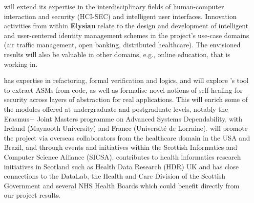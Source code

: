 \documentclass[a4paper,11pt]{article}
\newcommand{\project}[1]{\textbf{#1}\xspace}
\newcommand{\SECURITY}{\project{Elysian}}
\newcommand{\TheProject}{\SECURITY}
\begin{document}
\begin{mdframed}[backgroundcolor=blue!5]
\COGNIshort{} will extend its expertise in the interdisciplinary fields of human-computer interaction and security (HCI-SEC) and intelligent user interfaces. Innovation activities from \COGNIshort{} within \TheProject{} relate to the design and development of intelligent and user-centered identity management schemes in the project's use-case domains (air traffic management, open banking, distributed healthcare). The envisioned results will also be valuable in other domains, e.g., online education, that \COGNIshort{} is working in.
\end{mdframed}

\begin{mdframed}[backgroundcolor=blue!5]
\USTANshort{} has expertise in refactoring, formal verification and logics, and will explore \SCCHshort{}'s tool to extract ASMs from code, as well as formalise novel notions of self-healing for security across layers of abstraction for real applications. This will enrich some of the modules offered at undergraduate and postgraduate levels, notably the Erasmus+ Joint Masters programme on Advanced Systems Dependability, with Ireland (Maynooth University) and France (Universit\'e de Lorraine). 
\USTANshort{} will promote the project via overseas collaborators from the healthcare domain in the USA and Brazil, and through events and initiatives within the Scottish Informatics and Computer Science Alliance (SICSA). \USTANshort{} contributes to health informatics research initiatives in Scotland such as  Health Data Research (HDR) UK and has close connections to the DataLab, the Health and Care Division of the Scottish Government and several NHS Health Boards which could benefit directly from our project results.
\end{mdframed}
\end{document}
